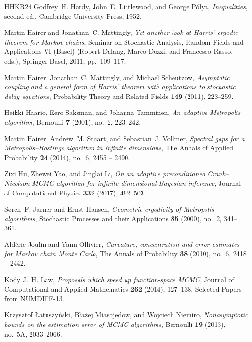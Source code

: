 \documentclass[12pt]{article}
\theoremstyle{definition}
\begin{document}
\begin{thebibliography}{HHKR24}
	Godfrey~H. Hardy, John~E. Littlewood, and George P{\'o}lya,
	\emph{Inequalities}, second ed., Cambridge University Press, 1952.
	
	Martin Hairer and Jonathan~C. Mattingly, \emph{Yet another look at {H}arris'
		ergodic theorem for {M}arkov chains}, Seminar on Stochastic Analysis,
	Random Fields and Applications VI (Basel) (Robert Dalang, Marco Dozzi, and
	Francesco Russo, eds.), Springer Basel, 2011, pp.~109--117.
	
	Martin Hairer, Jonathan~C. Mattingly, and Michael Scheutzow, \emph{Asymptotic
		coupling and a general form of {H}arris’ theorem with applications to
		stochastic delay equations}, Probability Theory and Related Fields
	\textbf{149} (2011), 223--259.
	
	Heikki Haario, Eero Saksman, and Johanna Tamminen, \emph{An adaptive
		{M}etropolis algorithm}, Bernoulli \textbf{7} (2001), no.~2, 223--242.
	
	Martin Hairer, Andrew~M. Stuart, and Sebastian~J. Vollmer, \emph{{Spectral gaps
			for a Metropolis–Hastings algorithm in infinite dimensions}}, The Annals of
	Applied Probability \textbf{24} (2014), no.~6, 2455 -- 2490.
	
	Zixi Hu, Zhewei Yao, and Jinglai Li, \emph{{On an adaptive preconditioned
			Crank–Nicolson MCMC algorithm for infinite dimensional Bayesian
			inference}}, Journal of Computational Physics \textbf{332} (2017), 492--503.
	
	S{\o}ren~F. Jarner and Ernst Hansen, \emph{Geometric ergodicity of Metropolis
		algorithms}, Stochastic Processes and their Applications \textbf{85} (2000),
	no.~2, 341--361.
	
	Ald{\'e}ric Joulin and Yann Ollivier, \emph{{Curvature, concentration and error
			estimates for Markov chain Monte Carlo}}, The Annals of Probability
	\textbf{38} (2010), no.~6, 2418 -- 2442.
	
	Kody J.~H. Law, \emph{Proposals which speed up function-space MCMC}, Journal of
	Computational and Applied Mathematics \textbf{262} (2014), 127--138, Selected
	Papers from NUMDIFF-13.
	
	Krzysztof {\L}atuszy{\'n}ski, B{\l}a{\.z}ej Miasojedow, and Wojciech Niemiro,
	\emph{Nonasymptotic bounds on the estimation error of {MCMC} algorithms},
	Bernoulli \textbf{19} (2013), no.~5A, 2033--2066.
	

\end{thebibliography}
\end{document}
